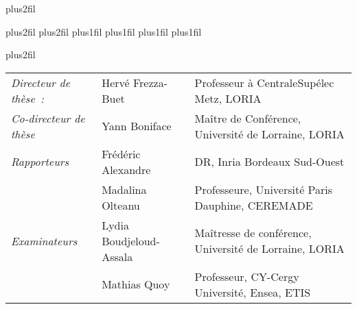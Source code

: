 \@ThesisFirstPageHead
\vskip10mm plus2fil
\begin{center}
                         \@ThesisTitle
\vskip3mm                         
                         \@ThesisSubtitle
\vskip10mm plus2fil
                         \@ThesisKind
\vskip5mm plus2fil
                      \@ThesisPresentedThe
\vskip3mm plus1fil
                      \@ThesisInOrderToGet
\vskip5mm plus1fil
                         \@ThesisDiploma
\vskip3mm plus1fil
                       \@ThesisPresentedBy
\vskip3mm plus1fil
                         \@ThesisAuthor
\end{center}
\vskip5mm plus2fil
          \hskip1cm\@ThesisJuryTitle
\begin{center}
        \begin{tabular}{lll}
            \textit{Directeur de thèse~:} & Hervé Frezza-Buet & Professeur à CentraleSupélec Metz, LORIA \\
            \textit{Co-directeur de thèse} & Yann Boniface & Maître de Conférence, Université de Lorraine, LORIA \\
            \textit{Rapporteurs} & Frédéric Alexandre & DR, Inria Bordeaux Sud-Ouest \\
                                & Madalina Olteanu & Professeure, Université Paris Dauphine, CEREMADE \\
            \textit{Examinateurs} & Lydia Boudjeloud-Assala & Maîtresse de conférence, Université de Lorraine, LORIA \\
                                    & Mathias Quoy & Professeur, CY-Cergy Université, Ensea, ETIS \\
        \end{tabular}
\end{center}
\vskip5mm
                     \@ThesisFirstPageFoot